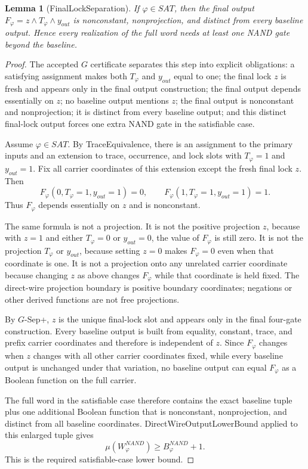 \documentclass[10.5pt,a4paper]{article}
\newtheorem{lemma}[theorem]{Lemma}
\begin{document}
\begin{lemma}[FinalLockSeparation]
If \(\varphi\in SAT\), then the final output \(F_\varphi=z\wedge T_\varphi\wedge y_{out}\) is nonconstant,
nonprojection, and distinct from every baseline output.  Hence every realization of the full word needs at least
one NAND gate beyond the baseline.
\end{lemma}
\begin{proof}
The accepted \(G\) certificate separates this step into explicit obligations: a satisfying assignment makes both
\(T_\varphi\) and \(y_{out}\) equal to one; the final lock \(z\) is fresh and appears only in the final output
construction; the final output depends essentially on \(z\); no baseline output mentions \(z\); the final output is
nonconstant and nonprojection; it is distinct from every baseline output; and this distinct final-lock output forces
one extra NAND gate in the satisfiable case.

Assume \(\varphi\in SAT\).  By TraceEquivalence, there is an assignment to the primary inputs and an extension
to trace, occurrence, and lock slots with \(T_\varphi=1\) and \(y_{out}=1\).  Fix all carrier coordinates of this
extension except the fresh final lock \(z\).  Then
\[
 F_\varphi(0,T_\varphi=1,y_{out}=1)=0,
 \qquad
 F_\varphi(1,T_\varphi=1,y_{out}=1)=1 .
\]
Thus \(F_\varphi\) depends essentially on \(z\) and is nonconstant.

The same formula is not a projection.  It is not the positive projection \(z\), because with \(z=1\) and either
\(T_\varphi=0\) or \(y_{out}=0\), the value of \(F_\varphi\) is still zero.  It is not the projection \(T_\varphi\)
or \(y_{out}\), because setting \(z=0\) makes \(F_\varphi=0\) even when that coordinate is one.  It is not a
projection onto any unrelated carrier coordinate because changing \(z\) as above changes \(F_\varphi\) while that
coordinate is held fixed.  The direct-wire projection boundary is positive boundary coordinates; negations or
other derived functions are not free projections.

By \(G\)-Sep+, \(z\) is the unique final-lock slot and appears only in the final four-gate construction.  Every
baseline output is built from equality, constant, trace, and prefix carrier coordinates and therefore is independent
of \(z\).  Since \(F_\varphi\) changes when \(z\) changes with all other carrier coordinates fixed, while every
baseline output is unchanged under that variation, no baseline output can equal \(F_\varphi\) as a Boolean
function on the full carrier.

The full word in the satisfiable case therefore contains the exact baseline tuple plus one additional Boolean
function that is nonconstant, nonprojection, and distinct from all baseline coordinates.  DirectWireOutputLowerBound
applied to this enlarged tuple gives
\[
 \mu(W^{NAND}_\varphi)\ge B^{NAND}_\varphi+1 .
\]
This is the required satisfiable-case lower bound.
\end{proof}
\end{document}
